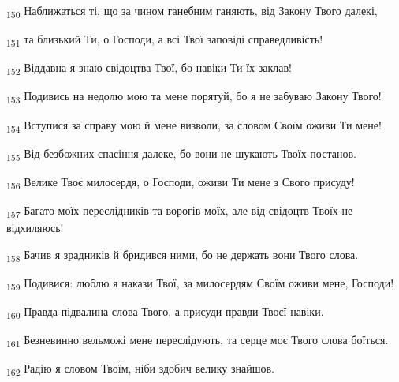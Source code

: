 \begin{tcolorbox}
\textsubscript{150} Наближаться ті, що за чином ганебним ганяють, від Закону Твого далекі,
\end{tcolorbox}
\begin{tcolorbox}
\textsubscript{151} та близький Ти, о Господи, а всі Твої заповіді справедливість!
\end{tcolorbox}
\begin{tcolorbox}
\textsubscript{152} Віддавна я знаю свідоцтва Твої, бо навіки Ти їх заклав!
\end{tcolorbox}
\begin{tcolorbox}
\textsubscript{153} Подивись на недолю мою та мене порятуй, бо я не забуваю Закону Твого!
\end{tcolorbox}
\begin{tcolorbox}
\textsubscript{154} Вступися за справу мою й мене визволи, за словом Своїм оживи Ти мене!
\end{tcolorbox}
\begin{tcolorbox}
\textsubscript{155} Від безбожних спасіння далеке, бо вони не шукають Твоїх постанов.
\end{tcolorbox}
\begin{tcolorbox}
\textsubscript{156} Велике Твоє милосердя, о Господи, оживи Ти мене з Свого присуду!
\end{tcolorbox}
\begin{tcolorbox}
\textsubscript{157} Багато моїх переслідників та ворогів моїх, але від свідоцтв Твоїх не відхиляюсь!
\end{tcolorbox}
\begin{tcolorbox}
\textsubscript{158} Бачив я зрадників й бридився ними, бо не держать вони Твого слова.
\end{tcolorbox}
\begin{tcolorbox}
\textsubscript{159} Подивися: люблю я накази Твої, за милосердям Своїм оживи мене, Господи!
\end{tcolorbox}
\begin{tcolorbox}
\textsubscript{160} Правда підвалина слова Твого, а присуди правди Твоєї навіки.
\end{tcolorbox}
\begin{tcolorbox}
\textsubscript{161} Безневинно вельможі мене переслідують, та серце моє Твого слова боїться.
\end{tcolorbox}
\begin{tcolorbox}
\textsubscript{162} Радію я словом Твоїм, ніби здобич велику знайшов.
\end{tcolorbox}
